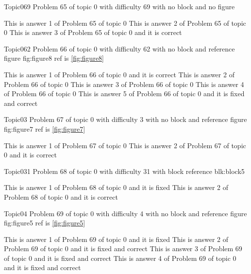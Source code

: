 \documentclass[master]{exam}
\begin{document}
\begin{problem}{Topic0}{69}
	Problem 65 of topic 0 with difficulty 69 with no block and no figure
	\begin{answers}
		\answer This is answer 1 of Problem 65 of topic 0 
		\answer This is answer 2 of Problem 65 of topic 0 
		\answer[correct] This is answer 3 of Problem 65 of topic 0 and it is correct
	\end{answers}
\end{problem}

\begin{problem}{Topic0}{62}
	Problem 66 of topic 0 with difficulty 62 with no block and reference figure fig:figure8 ref is \ref{fig:figure8}
	\begin{answers}
		\answer[correct] This is answer 1 of Problem 66 of topic 0 and it is correct
		\answer This is answer 2 of Problem 66 of topic 0 
		\answer This is answer 3 of Problem 66 of topic 0 
		\answer This is answer 4 of Problem 66 of topic 0 
		 This is answer 5 of Problem 66 of topic 0 and it is fixed and correct
	\end{answers}
\end{problem}

\begin{problem}{Topic0}{3}
	Problem 67 of topic 0 with difficulty 3 with no block and reference figure fig:figure7 ref is \ref{fig:figure7}
	\begin{answers}
		\answer This is answer 1 of Problem 67 of topic 0 
		\answer[correct] This is answer 2 of Problem 67 of topic 0 and it is correct
	\end{answers}
\end{problem}

\begin{problem}[requires=blk:block5]{Topic0}{31}
	Problem 68 of topic 0 with difficulty 31 with block reference blk:block5
	\begin{answers}
		\answer[fixed] This is answer 1 of Problem 68 of topic 0 and it is fixed
		\answer[correct] This is answer 2 of Problem 68 of topic 0 and it is correct
	\end{answers}
\end{problem}

\begin{problem}{Topic0}{4}
	Problem 69 of topic 0 with difficulty 4 with no block and reference figure fig:figure5 ref is \ref{fig:figure5}
	\begin{answers}
		\answer[fixed] This is answer 1 of Problem 69 of topic 0 and it is fixed
		 This is answer 2 of Problem 69 of topic 0 and it is fixed and correct
		 This is answer 3 of Problem 69 of topic 0 and it is fixed and correct
		 This is answer 4 of Problem 69 of topic 0 and it is fixed and correct
	\end{answers}
\end{problem}
\end{document}
